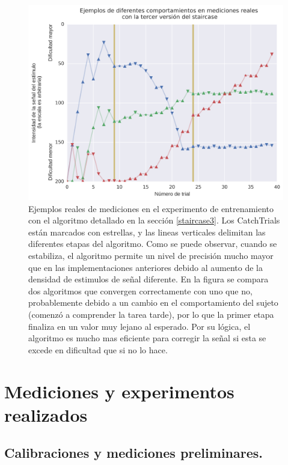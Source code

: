 \documentclass{article}
\begin{document}
    \begin{figure}
        \center
        \includegraphics[width=\textwidth]{Imagenes/StairCase3.png}
        \caption{Ejemplos reales de mediciones en el experimento de entrenamiento con el algoritmo detallado en la sección \ref{staircase3}. Los CatchTrials están marcados con estrellas, y las lineas verticales delimitan las diferentes etapas del algoritmo. Como se puede observar, cuando se estabiliza, el algoritmo permite un nivel de precisión mucho mayor que en las implementaciones anteriores debido al aumento de la densidad de estimulos de señal diferente. En la figura se compara dos algoritmos que convergen correctamente con uno que no, probablemente debido a un cambio en el comportamiento del sujeto (comenzó a comprender la tarea tarde), por lo que la primer etapa finaliza en un valor muy lejano al esperado. Por su lógica, el algoritmo es mucho mas eficiente para corregir la señal si esta se excede en dificultad que si no lo hace.}
        \label{fig:staircase3}
    \end{figure}  
    
\section{Mediciones y experimentos realizados}

\subsection{Calibraciones y mediciones preliminares.} \label{resultados:preliminares}
\end{document}
